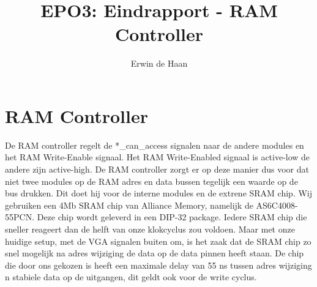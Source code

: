 \documentclass{scrreprt} %
\author{Erwin de Haan}
\title{EPO3: Eindrapport - RAM Controller}
\begin{document}
\chapter{RAM Controller}
\label{ch:ram-controller}
De RAM controller regelt de *\_can\_access signalen naar de andere modules en het RAM Write-Enable signaal. Het RAM Write-Enabled signaal is active-low de andere zijn active-high.
De RAM controller zorgt er op deze manier dus voor dat niet twee modules op de RAM adres en data bussen tegelijk een waarde op de bus drukken.
Dit doet hij voor de interne modules en de extrene SRAM chip.
Wij gebruiken een 4Mb SRAM chip van Alliance Memory, namelijk de AS6C4008-55PCN. 
Deze chip wordt geleverd in een DIP-32 package.
Iedere SRAM chip die sneller reageert dan de helft van onze klokcyclus zou voldoen.
Maar met onze huidige setup, met de VGA signalen buiten om, is het zaak dat de SRAM chip zo snel mogelijk na adres wijziging de data op de data pinnen heeft staan.
De chip die door ons gekozen is heeft een maximale delay van 55 ns tussen adres wijziging n stabiele data op de uitgangen, dit geldt ook voor de write cyclus.
\end{document}
